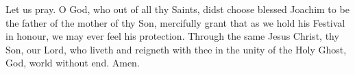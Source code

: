 \noindent Let us pray. O God, who out of all thy Saints, didst choose blessed Joachim to be the father of the mother of thy Son, mercifully grant that as we hold his Festival in honour, we may ever feel his protection. Through the same Jesus Christ, thy Son, our Lord, who liveth and reigneth with thee in the unity of the Holy Ghost, God, world without end. Amen.